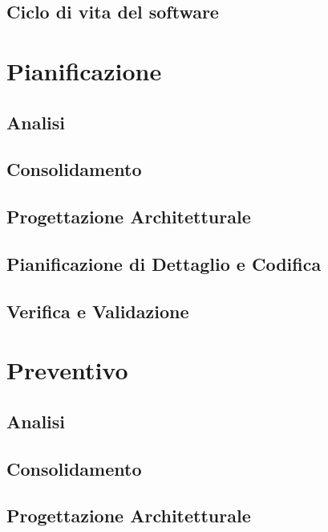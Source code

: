 \documentclass[a4paper, oneside, openany, dvipsnames, table]{article}
\begin{document}
	\subsection{Ciclo di vita del software}
		
\newpage
\section{Pianificazione}
	\label{sec:Pian}
	
	\newpage	
	\subsection{Analisi}
		
	\newpage	
	\subsection{Consolidamento}
		
	\newpage
	\subsection{Progettazione Architetturale}
		
	\newpage
	\subsection{Pianificazione di Dettaglio e Codifica}
		
	\newpage
	\subsection{Verifica e Validazione}
		
\newpage
\section{Preventivo}
	
	\newpage
	\subsection{Analisi}
	    
	\newpage	
	\subsection{Consolidamento}
	    
	\newpage
	\subsection{Progettazione Architetturale}
	    
	\newpage
\end{document}

